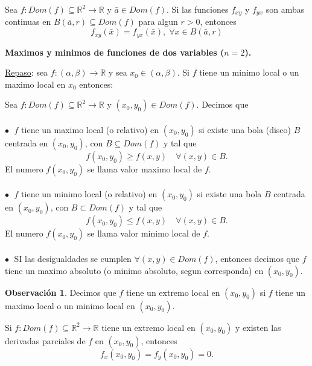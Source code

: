 \documentclass{article}
\theoremstyle{definition}
\newtheorem*{obs}{Observación}
\theoremstyle{remark}
\newcommand\bl{$\bullet\;$}
\begin{document}
\begin{teo}
  Sea $f : Dom(f) \subseteq \mathbb{R}^2 \to \mathbb{R}$ y $\bar{a} \in Dom(f)$. Si las funciones $f_{xy}$ y $f_{yx}$ son ambas continuas en $B(\bar{a},r)  \subseteq Dom(f)$ para algun $r>0$, entonces \[
    f_{xy}(\bar{x})=f_{yx}(\bar{x}), \; \forall x \in B(\bar{a},r)
  \]
\end{teo}
\begin{center}
\textbf{Maximos y minimos de funciones de dos variables ($n=2$).}
\end{center}
\underline{Repaso}: sea $f : (\alpha, \beta) \to \mathbb{R}$ y sea $x_0 \in (\alpha,\beta)$. Si $f$ tiene un minimo local o un maximo local en $x_0$ entonces: 
  \begin{figure}[h]
\centering
\def\svgwidth{1\textwidth}
\makebox[\textwidth]{
}
\end{figure} \; \pagebreak
\begin{defi}
  Sea $f : Dom(f) \subseteq \mathbb{R}^2 \to \mathbb{R}$ y $(x_0,y_0) \in Dom(f)$. Decimos que \\\\
  \textcolor{rojop2}{\bl} $f$ tiene un maximo local (o relativo) en $(x_0,y_0)$ si existe una bola (disco) $B$ centrada en $(x_0,y_0)$, con $B \subseteq Dom(f)$ y tal que  $$f(x_0,y_0) \geq f(x,y) \quad \forall (x,y) \in B.$$ El numero $f(x_0,y_0)$ se llama valor maximo local de $f$. \\\\
  \textcolor{rojop2}{\bl} $f$ tiene un minimo local (o relativo) en $(x_0,y_0)$ si existe una bola $B$ centrada en $(x_0,y_0)$, con $B \subset Dom(f)$ y tal que \[
  f(x_0,y_0) \leq f(x,y) \quad \forall (x,y) \in B.
  \]
  El numero $f(x_0,y_0)$ se llama valor minimo local de $f$.\\\\
  \textcolor{rojop2}{\bl} SI las desigualdades se cumplen $\forall (x,y) \in Dom(f)$, entonces decimos que $f$ tiene un maximo absoluto (o minimo absoluto, segun corresponda) en $(x_0,y_0)$.
\end{defi}
\begin{obs}
  Decimos que $f$ tiene un extremo local en $(x_0,y_0)$ si $f$ tiene un maximo local o un minimo local en $(x_0,y_0)$.
\end{obs}
\begin{teo}
  Si $f : Dom(f) \subseteq \mathbb{R}^2 \to \mathbb{R}$ tiene un extremo local en $(x_0,y_0)$ y existen las derivadas parciales de $f$ en $(x_0,y_0)$, entonces $$f_x(x_0,y_0)=f_y(x_0,y_0)=0.$$
\end{teo}
\end{document}
